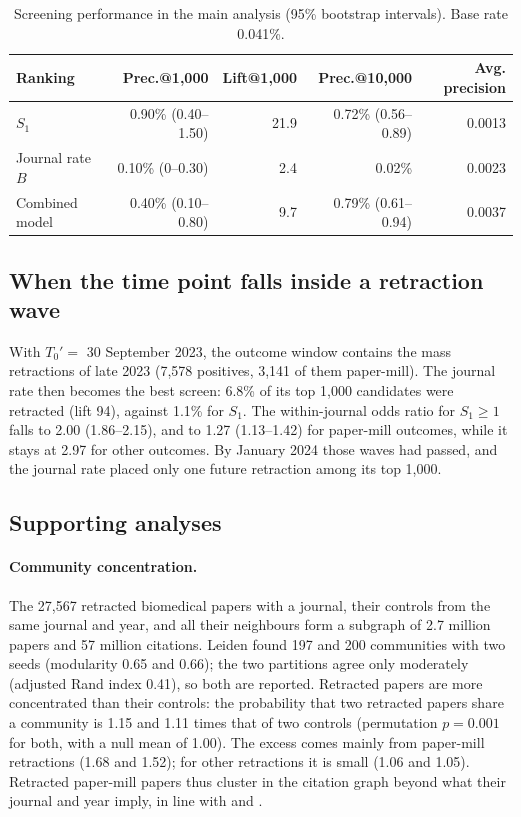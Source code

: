 \documentclass[pdflatex,sn-basic]{sn-jnl}
\begin{document}
\begin{table}[t]
\centering
\caption{Screening performance in the main analysis (95\% bootstrap intervals). Base rate 0.041\%.}\label{tab:screen}
\begin{tabular}{lrrrr}
\toprule
Ranking & Prec.@1,000 & Lift@1,000 & Prec.@10,000 & Avg. precision \\
\midrule
$S_1$ & 0.90\% (0.40--1.50) & 21.9 & 0.72\% (0.56--0.89) & 0.0013 \\
Journal rate $B$ & 0.10\% (0--0.30) & 2.4 & 0.02\% & 0.0023 \\
Combined model & 0.40\% (0.10--0.80) & 9.7 & 0.79\% (0.61--0.94) & 0.0037 \\
\bottomrule
\end{tabular}
\end{table}

\subsection{When the time point falls inside a retraction wave}
With $T_0' = $ 30 September 2023, the outcome window contains the mass retractions of late 2023 (7,578 positives,
3,141 of them paper-mill). The journal rate then becomes the best screen: 6.8\% of its top 1,000 candidates were
retracted (lift 94), against 1.1\% for $S_1$. The within-journal odds ratio for $S_1 \ge 1$ falls to 2.00
(1.86--2.15), and to 1.27 (1.13--1.42) for paper-mill outcomes, while it stays at 2.97 for other outcomes. By
January 2024 those waves had passed, and the journal rate placed only one future retraction among its top 1,000.

\subsection{Supporting analyses}
\paragraph{Community concentration.} The 27,567 retracted biomedical papers with a journal, their controls from the
same journal and year, and all their neighbours form a subgraph of 2.7 million papers and 57 million citations. Leiden
found 197 and 200 communities with two seeds (modularity 0.65 and 0.66); the two partitions agree only moderately
(adjusted Rand index 0.41), so both are reported. Retracted papers are more concentrated than their controls: the probability that
two retracted papers share a community is 1.15 and 1.11 times that of two controls (permutation $p = 0.001$ for
both, with a null mean of 1.00). The excess comes mainly from paper-mill retractions (1.68 and 1.52); for other
retractions it is small (1.06 and 1.05). Retracted paper-mill papers thus cluster in the citation graph beyond what
their journal and year imply, in line with \citet{feng2024molbio} and \citet{candal2024references}.
\end{document}
